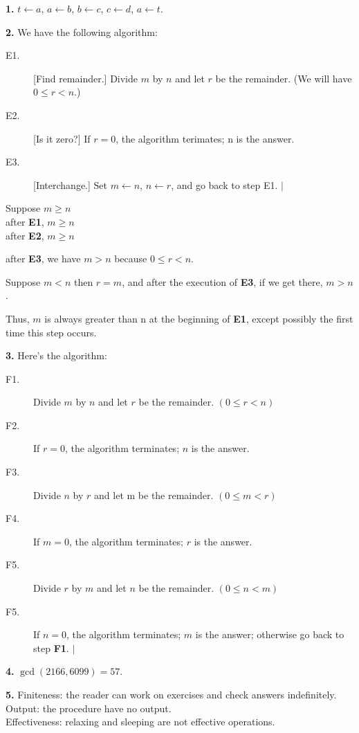 \documentclass[a4paper,12pt]{article}
\begin{document}
\noindent
\textbf{1.} $t \leftarrow a$, $a \leftarrow b$, $b \leftarrow c$, 
$c \leftarrow d$, $a \leftarrow t$.

\bigskip
\noindent
\textbf{2.} We have the following algorithm:
\begin{description}
\item[E1.]
[Find remainder.] Divide $m$ by $n$ and let $r$ be the remainder.
(We will have $0 \leq r < n$.)
\item[E2.]
[Is it zero?] If $r = 0$, the algorithm terimates; n is the answer.
\item[E3.]
[Interchange.] Set $m \leftarrow n$, $n \leftarrow r$, and go back
to step E1. $|$
\end{description}

\noindent
Suppose $m \ge n$\\
after \textbf{E1}, $m \ge n$\\
after \textbf{E2}, $m \ge n$

\noindent
after \textbf{E3}, we have $m > n$ because $0 \le r < n$.

Suppose $m < n$ then $r = m$, and after the execution of \textbf{E3}, 
if we get there, $m > n$.

\medskip
Thus, $m$ is always greater than n at the beginning of \textbf{E1}, 
except possibly the first time this step occurs.

\bigskip
\noindent
\textbf{3.} Here's the algorithm:
\begin{description}
\item[F1.]
Divide $m$ by $n$ and let $r$ be the remainder. $(0 \le r < n)$
\item[F2.]
If $r = 0$, the algorithm terminates; $n$ is the answer.
\item[F3.]
Divide $n$ by $r$ and let m be the remainder. $(0 \le m < r)$
\item[F4.]
If $m = 0$, the algorithm terminates; $r$ is the answer.
\item[F5.]
Divide $r$ by $m$ and let $n$ be the remainder. $(0 \le n < m)$
\item[F5.]
If $n = 0$, the algorithm terminates; $m$ is the answer; otherwise go
back to step \textbf{F1}. $|$
\end{description}

\bigskip
\noindent
\textbf{4.} $\gcd(2166, 6099) = 57$.

\bigskip
\noindent
\textbf{5.} Finiteness: the reader can work on exercises and check answers
indefinitely.\\
Output: the procedure have no output.\\
Effectiveness: relaxing and sleeping are not effective operations.
\end{document}

